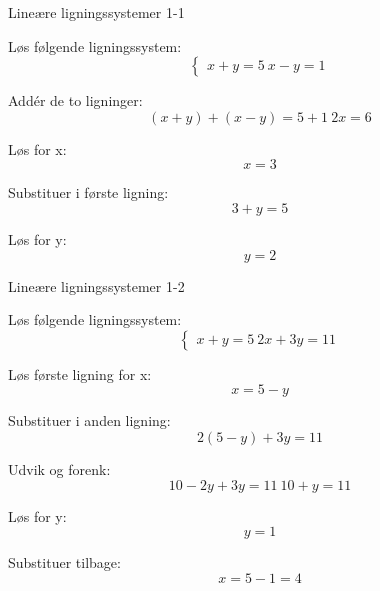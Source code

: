 \documentclass{article}
\begin{document}

\tableofcontents
\newpage

\begin{exercise}{Lineære ligningssystemer 1-1}

Løs følgende ligningssystem:
\[
\begin{cases}
 x + y = 5 \
 x - y = 1
 \end{cases}
\]


\hint

Addér de to ligninger:
\[
(x + y) + (x - y) = 5 + 1 \ 2x = 6
\]

\hint

Løs for x:
\[
x = 3
\]

\hint

Substituer i første ligning:
\[
3 + y = 5
\]

\hint

Løs for y:
\[
y = 2
\]

\end{exercise}

\newpage

\begin{exercise}{Lineære ligningssystemer 1-2}

Løs følgende ligningssystem:
\[
\begin{cases}
 x + y = 5 \
 2x + 3y = 11
 \end{cases}
\]


\hint

Løs første ligning for x:
\[
x = 5 - y
\]

\hint

Substituer i anden ligning:
\[
2(5 - y) + 3y = 11
\]

\hint

Udvik og forenk:
\[
10 - 2y + 3y = 11 \ 10 + y = 11
\]

\hint

Løs for y:
\[
y = 1
\]

\hint

Substituer tilbage:
\[
x = 5 - 1 = 4
\]

\end{exercise}
\end{document}
